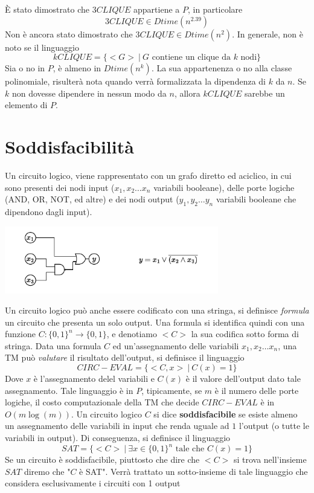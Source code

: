 \documentclass[10pt, letterpaper]{report}
\begin{document}
È stato dimostrato che $3CLIQUE$ appartiene a $P$, in particolare 
$$ 3CLIQUE\in Dtime(n^{2.39})$$
Non è ancora stato dimostrato che $ 3CLIQUE\in Dtime(n^{2})$. In generale, non è noto se il linguaggio
$$ kCLIQUE=\{<G> \ | \ G \text{ contiene un clique da $k$ nodi}\}$$ 
Sia o no in $P$, è almeno in $Dtime(n^k)$. La sua appartenenza o no alla classe polinomiale, risulterà nota quando verrà formalizzata la dipendenza di $k$ da $n$. Se $k$ non dovesse dipendere in nessun modo da $n$, allora $kCLIQUE$ sarebbe un elemento di $P$.\flowerLine 
\section{Soddisfacibilità}
Un circuito logico, viene rappresentato con un grafo diretto ed aciclico, in cui sono presenti dei nodi input ($x_1,x_2\dots x_n$ variabili booleane), delle porte logiche (AND, OR, NOT, ed altre) e dei nodi output ($y_1,y_2\dots y_n$ variabili booleane che dipendono dagli input).
\begin{center}
    \includegraphics[width=0.7\textwidth ]{images/circLogico.pdf}
\end{center}
Un circuito logico può anche essere codificato con una stringa, si definisce \textit{formula} un circuito che presenta un solo output. Una formula si identifica quindi con una funzione $C:\{0,1\}^n\rightarrow \{0,1\}$, e denotiamo $<C>$ la sua codifica sotto forma di stringa. Data una formula $C$ ed un'assegnamento delle variabili $x_1,x_2\dots x_n$, una TM può \textit{valutare} il risultato dell'output, si definisce il linguaggio 
$$ CIRC-EVAL = \{<C,x> \ | \ C(x)=1\}$$
Dove $x$ è l'assegnamento delel variabili e $C(x)$ è il valore dell'output dato tale assegnamento. Tale linguaggio è in $P$, tipicamente, se $m$ è il numero delle porte logiche, il costo computazionale della TM che decide $CIRC-EVAL$ è in $O(m\log(m))$.\acc 
{} Un circuito logico $C$ si dice \textbf{soddisfacibile} se esiste almeno un assegnamento delle variabili in input che renda uguale ad $1$ l'output (o tutte le variabili in output). Di conseguenza, si definisce il linguaggio 
$$ SAT = \{<C> \ | \ \exists x\in \{0,1\}^n \text{ tale che }C(x)=1\}$$
Se un circuito è soddisfacibile, piuttosto che dire che $<C>$ si trova nell'insieme $SAT$ diremo che "$C$ è SAT". Verrà trattato un sotto-insieme di tale linguaggio che considera esclusivamente i circuiti con 1 output 
\end{document}
